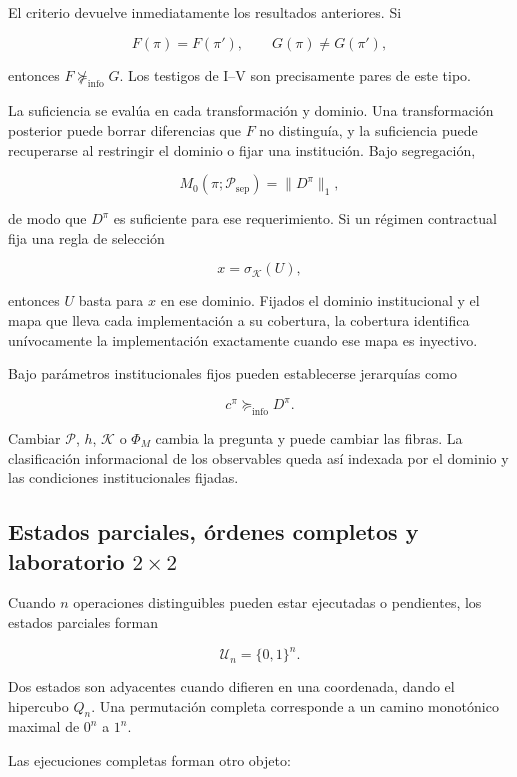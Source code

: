 \documentclass[10pt,a5paper,twoside]{article}
\begin{document}
El criterio devuelve inmediatamente los resultados anteriores. Si

\[
F(\pi)=F(\pi'),
\qquad
G(\pi)\ne G(\pi'),
\]

entonces \(F\not\succeq_{\mathrm{info}}G\). Los testigos de I--V son
precisamente pares de este tipo.

La suficiencia se evalúa en cada transformación y dominio. Una
transformación posterior puede borrar diferencias que \(F\) no distinguía,
y la suficiencia puede recuperarse al restringir el dominio o fijar una
institución. Bajo segregación,

\[
M_0(\pi;\mathcal P_{\mathrm{sep}})
=
\|D^\pi\|_1,
\]

de modo que \(D^\pi\) es suficiente para ese requerimiento. Si un
régimen contractual fija una regla de selección

\[
x=\sigma_{\mathcal K}(U),
\]

entonces \(U\) basta para \(x\) en ese dominio. Fijados el dominio institucional y el mapa que lleva cada implementación a
su cobertura, la cobertura identifica unívocamente la implementación
exactamente cuando ese mapa es inyectivo.

Bajo parámetros institucionales fijos pueden establecerse jerarquías
como

\[
c^\pi\succeq_{\mathrm{info}}D^\pi.
\]

Cambiar \(\mathcal P\), \(h\), \(\mathcal K\) o \(\Phi_M\) cambia
la pregunta y puede cambiar las fibras. La clasificación informacional de
los observables queda así indexada por el dominio y las condiciones
institucionales fijadas.

\subsection{\texorpdfstring{Estados parciales, órdenes completos y laboratorio \(2\times2\)}{Estados parciales, órdenes completos y laboratorio 2\textbackslash times2}}\label{estados-parciales-uxf3rdenes-completos-y-laboratorio-2times2}

Cuando \(n\) operaciones distinguibles pueden estar ejecutadas o
pendientes, los estados parciales forman

\[
\mathcal U_n=\{0,1\}^n.
\]

Dos estados son adyacentes cuando difieren en una coordenada, dando el
hipercubo \(Q_n\). Una permutación completa corresponde a un camino
monotónico maximal de \(0^n\) a \(1^n\).

Las ejecuciones completas forman otro objeto:
\end{document}
